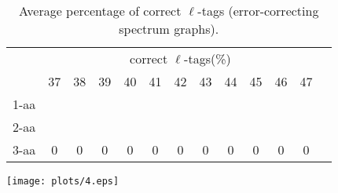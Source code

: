 \documentclass{article}
\begin{document}
\begin{table}[h]\tiny
\vspace{3mm}
{\centering
\begin{center}
\begin{tabular}{|l|c|c|c|c|c|c|c|c|c|c|c|c|}
  \hline
  & \multicolumn{ 11 }{|c|}{correct $\ell$-tags(\%)} \\
  \cline{2- 12}
    & 37 & 38 & 39 & 40 & 41 & 42 & 43 & 44 & 45 & 46 & 47\\
  \hline
1-aa  &  &  &  &  &  &  &  &  &  &  & \\
2-aa  &  &  &  &  &  &  &  &  &  &  & \\
3-aa  & 0 & 0 & 0 & 0 & 0 & 0 & 0 & 0 & 0 & 0 & 0\\
 \hline
\end{tabular}
\end{center}
\par}
\centering

\caption{ Average percentage of correct $\ell$-tags (error-correcting spectrum graphs).}

\vspace{3mm}
\label{table:table3}
\end{table}
\texttt{[image: plots/4.eps]}
\end{document}
